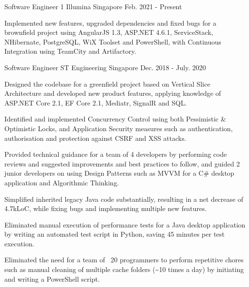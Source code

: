 

\begin{cventries}

\cventry
{Software Engineer 1} %
{Illumina} %
{Singapore} %
{Feb. 2021 - Present} %
{
  \begin{cvitems} %
    \item {Implemented new features, upgraded dependencies and fixed bugs for a brownfield project using AngularJS 1.3, ASP.NET 4.6.1, ServiceStack, NHibernate, PostgreSQL, WiX Toolset and PowerShell, with Continuous Integration using TeamCity and Artifactory.}
  \end{cvitems}
}

  \cventry
    {Software Engineer} %
    {ST Engineering} %
    {Singapore} %
    {Dec. 2018 - July. 2020} %
    {
      \begin{cvitems} %
        \item {Designed the codebase for a greenfield project based on Vertical Slice Architecture and developed new product features, applying knowledge of ASP.NET Core 2.1, EF Core 2.1, Mediatr, SignalR and SQL.}
        \item {Identified and implemented Concurrency Control using both Pessimistic \& Optimistic Locks, and Application Security measures such as authentication, authorisation and protection against CSRF and XSS attacks.}
        \item {Provided technical guidance for a team of 4 developers by performing code reviews and suggested improvements and best practices to follow, and guided 2 junior developers on using Design Patterns such as MVVM for a C\# desktop application and Algorithmic Thinking.}
        \item {Simplified inherited legacy Java code substantially, resulting in a net decrease of 4.7kLoC, while fixing bugs and implementing multiple new features.}
        \item {Eliminated manual execution of performance tests for a Java desktop application by writing an automated test script in Python, saving 45 minutes per test execution.}
        \item {Eliminated the need for a team of ~20 programmers to perform repetitive chores such as manual cleaning of multiple cache folders (\textasciitilde10 times a day) by initiating and writing a PowerShell script.}
      \end{cvitems}
    }


\end{cventries}

